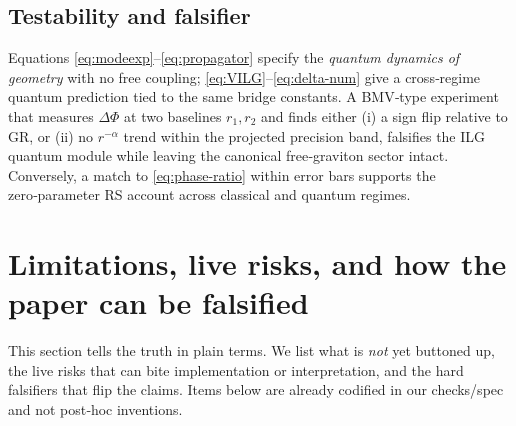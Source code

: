 \documentclass[11pt]{article}
\begin{document}
\subsection*{Testability and falsifier}

Equations \eqref{eq:modeexp}–\eqref{eq:propagator} specify the \emph{quantum dynamics of geometry} with no free coupling; \eqref{eq:VILG}–\eqref{eq:delta-num} give a cross‑regime quantum prediction tied to the same bridge constants. A BMV‑type experiment that measures $\Delta\Phi$ at two baselines $r_1,r_2$ and finds either (i) a sign flip relative to GR, or (ii) no $r^{-\alpha}$ trend within the projected precision band, falsifies the ILG quantum module while leaving the canonical free‑graviton sector intact. Conversely, a match to \eqref{eq:phase-ratio} within error bars supports the zero‑parameter RS account across classical and quantum regimes.


\section{Limitations, live risks, and how the paper can be falsified}
This section tells the truth in plain terms. We list what is \emph{not} yet buttoned up, the live risks that can bite implementation or interpretation, and the hard falsifiers that flip the claims. Items below are already codified in our checks/spec and not post‑hoc inventions. %
\end{document}
